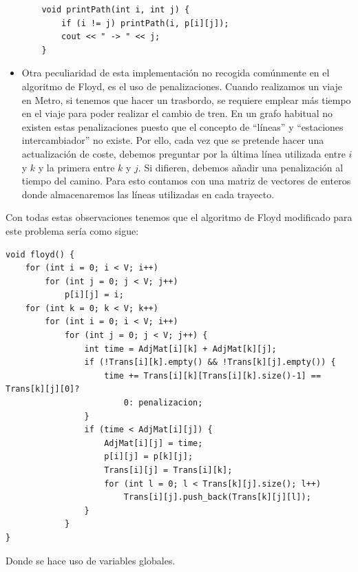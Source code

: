 \documentclass[spanish, a4paper, 12pt] {article}
\begin{document}
\begin{itemize}
{\begin{verbatim}
    void printPath(int i, int j) {
        if (i != j) printPath(i, p[i][j]);
        cout << " -> " << j;
    }
\end{verbatim}
}
\item{
Otra peculiaridad de esta implementación no recogida comúnmente en el algoritmo de Floyd, es el uso de penalizaciones. Cuando realizamos un viaje en Metro, si tenemos que hacer un trasbordo, se requiere emplear más tiempo en el viaje para poder realizar el cambio de tren. En un grafo habitual no existen estas penalizaciones puesto que el concepto de ``líneas'' y ``estaciones intercambiador'' no existe. Por ello, cada vez que se pretende hacer una actualización de coste, debemos preguntar por la última línea utilizada entre $i$ y $k$ y la primera entre $k$ y $j$. Si difieren, debemos añadir una penalización al tiempo del camino. Para esto contamos con una matriz de vectores de enteros donde almacenaremos las líneas utilizadas en cada trayecto.
}
\end{itemize}
Con todas estas observaciones tenemos que el algoritmo de Floyd modificado para este problema sería como sigue:
\begin{verbatim}
void floyd() {
    for (int i = 0; i < V; i++)
        for (int j = 0; j < V; j++)
            p[i][j] = i;
    for (int k = 0; k < V; k++)
        for (int i = 0; i < V; i++)
            for (int j = 0; j < V; j++) {
                int time = AdjMat[i][k] + AdjMat[k][j];
                if (!Trans[i][k].empty() && !Trans[k][j].empty()) {
                    time += Trans[i][k][Trans[i][k].size()-1] == Trans[k][j][0]?
                        0: penalizacion;
                }
                if (time < AdjMat[i][j]) {
                    AdjMat[i][j] = time;
                    p[i][j] = p[k][j];
                    Trans[i][j] = Trans[i][k];
                    for (int l = 0; l < Trans[k][j].size(); l++)
                        Trans[i][j].push_back(Trans[k][j][l]);
                }
            }
}
\end{verbatim}
Donde se hace uso de variables globales.
\end{document}
